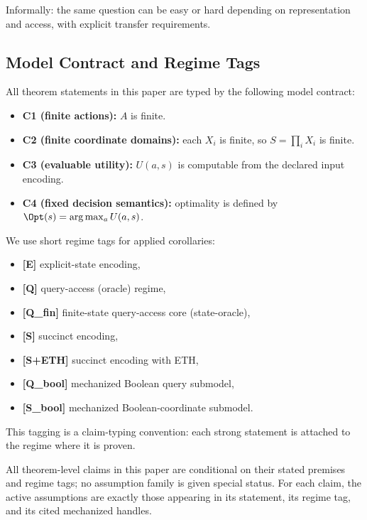 Informally: the same question can be easy or hard depending on representation and access, with explicit transfer requirements.

\subsection{Model Contract and Regime Tags}\label{sec:model-contract}

All theorem statements in this paper are typed by the following model contract:
\begin{itemize}
\item \textbf{C1 (finite actions):} $A$ is finite.
\item \textbf{C2 (finite coordinate domains):} each $X_i$ is finite, so $S=\prod_i X_i$ is finite.
\item \textbf{C3 (evaluable utility):} $U(a,s)$ is computable from the declared input encoding.
\item \textbf{C4 (fixed decision semantics):} optimality is defined by $\Opt(s)=\arg\max_a U(a,s)$.
\end{itemize}

We use short regime tags for applied corollaries:
\begin{itemize}
\item \textbf{[E]} explicit-state encoding,
\item \textbf{[Q]} query-access (oracle) regime,
\item \textbf{[Q\_fin]} finite-state query-access core (state-oracle),
\item \textbf{[S]} succinct encoding,
\item \textbf{[S+ETH]} succinct encoding with ETH,
\item \textbf{[Q\_bool]} mechanized Boolean query submodel,
\item \textbf{[S\_bool]} mechanized Boolean-coordinate submodel.
\end{itemize}

This tagging is a claim-typing convention: each strong statement is attached to the regime where it is proven.

\begin{remark}\label{rem:uniform-assumption-discipline}
All theorem-level claims in this paper are conditional on their stated premises and regime tags; no assumption family is given special status.
For each claim, the active assumptions are exactly those appearing in its statement, its regime tag, and its cited mechanized handles.
\end{remark}

